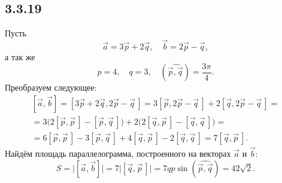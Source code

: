 \subsection{3.3.19}

Пусть
\[
\vec a=3\vec p+2\vec q,\quad\vec b=2\vec p-\vec q,
\]
а так же
\[
p=4,\quad q=3,\quad\left(\widehat{\vec p,\vec q}\right)=\frac{3\pi}{4}.
\]
Преобразуем следующее:
\begin{multline*}
\left[\vec a,\vec b\right]=\left[3\vec p+2\vec q,2\vec p-\vec q\,\right]=3\left[\vec p,2\vec p-\vec q\,\right]+2\left[\vec q,2\vec p-\vec q\,\right]= \\
=3\bigl(2\left[\vec p,\vec p\,\right]-\left[\vec p,\vec q\,\right]\bigr)+2\bigl(2\left[\vec q,\vec p\,\right]-\left[\vec q,\vec q\,\right]\bigr)= \\
=6\left[\vec p,\vec p\,\right]-3\left[\vec p,\vec q\,\right]+4\left[\vec q,\vec p\,\right]-2\left[\vec q,\vec q\,\right]=7\left[\vec q,\vec p\,\right].
\end{multline*}
Найдём площадь параллелограмма, построенного на векторах $\vec a$ и $\vec b$:
\[
S=\biggl|\left[\vec a,\vec b\right]\biggr|=7\bigl|\left[\vec q,\vec p\,\right]\bigr|=7qp\sin\left(\widehat{\vec p,\vec q}\right)=42\sqrt{2}.
\]